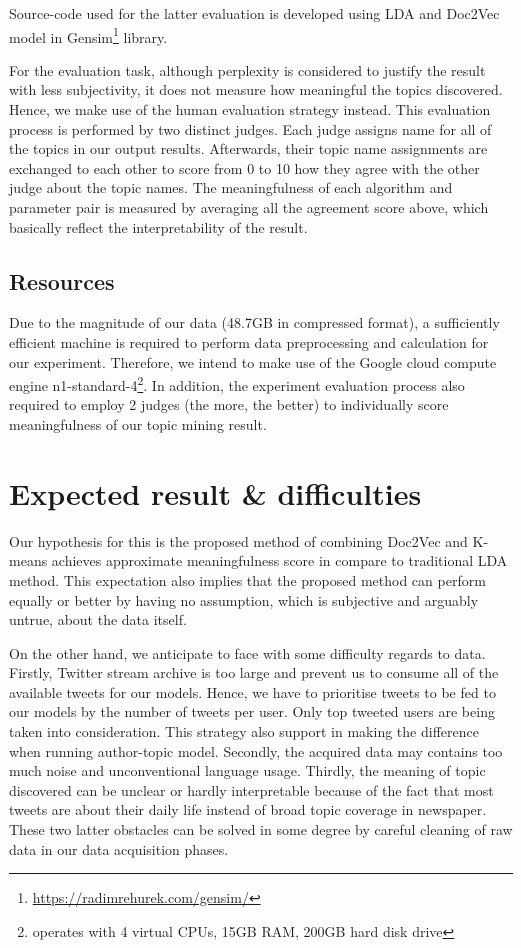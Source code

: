 \documentclass[conference,compsoc]{IEEEtran}
\begin{document}
Source-code used for the latter evaluation is developed using LDA and Doc2Vec model in Gensim\footnote{\url{https://radimrehurek.com/gensim/}} library.

For the evaluation task, although perplexity is considered to justify the result with less subjectivity, it does not measure how meaningful the topics discovered. Hence, we make use of the human evaluation strategy\cite{zhao2011comparing} instead. This evaluation process is performed by two distinct judges. Each judge assigns name for all of the topics in our output results. Afterwards, their topic name assignments are exchanged to each other to score from 0 to 10 how they agree with the other judge about the topic names. The meaningfulness of each algorithm and parameter pair is measured by averaging all the agreement score above, which basically reflect the interpretability of the result.

\subsection{Resources} \label{resources}

Due to the magnitude of our data (48.7GB in compressed format), a sufficiently efficient machine is required to perform data preprocessing and calculation for our experiment. Therefore, we intend to make use of the Google cloud compute engine n1-standard-4\footnote{operates with 4 virtual CPUs, 15GB RAM, 200GB hard disk drive}. In addition, the experiment evaluation process also required to employ 2 judges (the more, the better) to individually score meaningfulness of our topic mining result.

\section{Expected result \& difficulties} \label{expectation}

Our hypothesis for this is the proposed method of combining Doc2Vec and K-means achieves approximate meaningfulness score in compare to traditional LDA method. This expectation also implies that the proposed method can perform equally or better by having no assumption, which is subjective and arguably untrue, about the data itself.

On the other hand, we anticipate to face with some difficulty regards to data. Firstly, Twitter stream archive is too large and prevent us to consume all of the available tweets for our models. Hence, we have to prioritise tweets to be fed to our models by the number of tweets per user. Only top tweeted users are being taken into consideration. This strategy also support in making the difference when running author-topic model. Secondly, the acquired data may contains too much noise and unconventional language usage. Thirdly, the meaning of topic discovered can be unclear or hardly interpretable because of the fact that most tweets are about their daily life instead of broad topic coverage in newspaper. These two latter obstacles can be solved in some degree by careful cleaning of raw data in our data acquisition phases.



\end{document}
